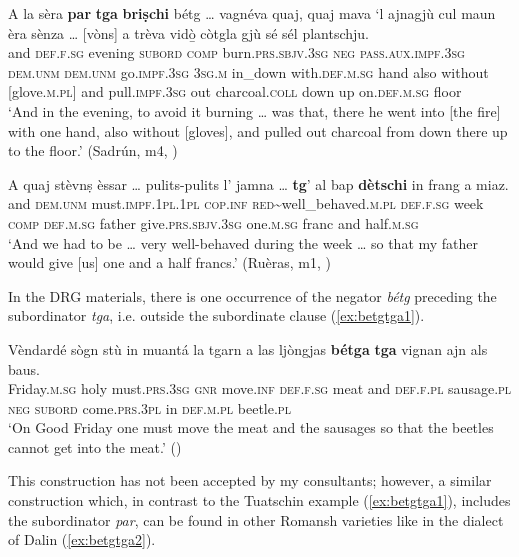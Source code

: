 \ea
\label{ex:purppartga}
\gll  A la sèra \textbf{par} \textbf{tga} \textbf{briṣchi} bétg … vagnéva quaj, quaj mava `l ajnagjù cul maun èra sènza … [vòns] a trèva vidò̱ còtgla gjù sé sél plantschju.\\
and \textsc{def.f.sg} evening \textsc{subord} \textsc{comp} burn.\textsc{prs.sbjv.3sg} \textsc{neg} {} \textsc{pass.aux.impf.3sg} \textsc{dem.unm} \textsc{dem.unm} go.\textsc{impf.3sg} \textsc{3sg.m} in\_down with.\textsc{def.m.sg} hand also without {} [glove.\textsc{m.pl}] and pull.\textsc{impf.3sg} out charcoal.\textsc{coll} down up on.\textsc{def.m.sg} floor  \\
\glt `And in the evening, to avoid it burning … was that, there he went into [the fire] with one hand, also without [gloves], and pulled out charcoal from down there up to the floor.' (Sadrún, m4, )
\z

\ea
\label{ex:purptga}
	\gll    A quaj stèvnṣ èssar … pulits-pulits l’ jamna … {\longrule} \textbf{tg}’ al bap \textbf{dètschi} in frang a miaz.\\
	and \textsc{dem.unm} must.\textsc{impf.1pl.1pl} \textsc{cop.inf} {} \textsc{red}\textasciitilde{well\_behaved}.\textsc{m.pl} \textsc{def.f.sg} week {} {}  \textsc{comp} \textsc{def.m.sg} father  give.\textsc{prs.sbjv.3sg} one.\textsc{m.sg} franc and half.\textsc{m.sg}\\
\glt `And we had to be … very well-behaved during the week … so that my father would give [us] one and a half francs.' (Ruèras, m1, )
\z



In the DRG materials, there is one occurrence of the negator \textit{bétg} preceding the subordinator \textit{tga}, i.e. outside the subordinate clause (\ref{ex:betgtga1}).

\ea
\label{ex:betgtga1}
\gll Vèndardé sògn stù in muantá la tgarn a las ljòngjas \textbf{bétga} \textbf{tga} vignan ajn als baus.\\
Friday.\textsc{m.sg} holy must.\textsc{prs.3sg} \textsc{gnr} move.\textsc{inf} \textsc{def.f.sg} meat and \textsc{def.f.pl} sausage.\textsc{pl} \textsc{neg} \textsc{subord} come.\textsc{prs.3pl} in \textsc{def.m.pl} beetle.\textsc{pl}\\
\glt `On Good Friday one must move the meat and the sausages so that the beetles cannot get into the meat.' ()
\z

This construction has not been accepted by my consultants; however, a similar construction which, in contrast to the Tuatschin example (\ref{ex:betgtga1}), includes the subordinator \textit{par}, can be found in other Romansh varieties like in the  dialect of Dalin (\ref{ex:betgtga2}).

